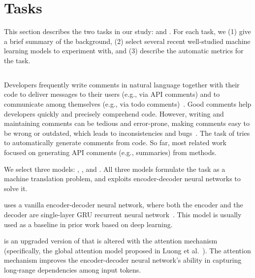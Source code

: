 \section{Tasks}
\label{sec:tasks}

This section describes the two tasks in our study: \comgen and
\methnam.  For each task, we (1) give a brief summary of the
background, (2) select several recent well-studied machine learning
models to experiment with, and (3) describe the automatic metrics for
the task.

\subsection{\ComGen}
\label{sec:tasks:comgen}

 Developers frequently write comments in natural
language together with their code to deliver messages to their users
(e.g., via API comments) and to communicate among themselves (e.g.,
via todo
comments)~\cite{PadioleauETAL09Listening,NieETAL18Natural,PascarellaETAL19Classifying}.
Good comments help developers quickly and precisely comprehend code.
However, writing and maintaining comments can be tedious and
error-prone, making comments easy to be wrong or outdated, which leads
to inconsistencies and
bugs~\cite{TanETAL07Icomment,TanETAL12TComment,RatolAndRobillard17Detecting}.
The task of \comgen tries to automatically generate comments from
code.  So far, most related work~\cite{HuETAL18Deep,HuETAL19Deep,XXX}
focused on generating API comments (e.g., \javadoc summaries) from
methods.

 We select three models: ,
, and .  All three models
formulate the \comgen task as a machine translation problem, and
exploits encoder-decoder neural networks to solve it.

 uses a vanilla encoder-decoder neural network,
where both the encoder and the decoder are single-layer GRU recurrent
neural network~\cite{ChoETAL14Learning}.  This model is usually used
as a baseline
in prior work based on deep learning. 

 is an upgraded version of
 that is altered with the attention mechanism
(specifically, the global attention model proposed in Luong et
al.~\cite{LuongETAL15Effective}).  The attention mechanism improves
the encoder-decoder neural network's ability in capturing long-range
dependencies among input tokens.

